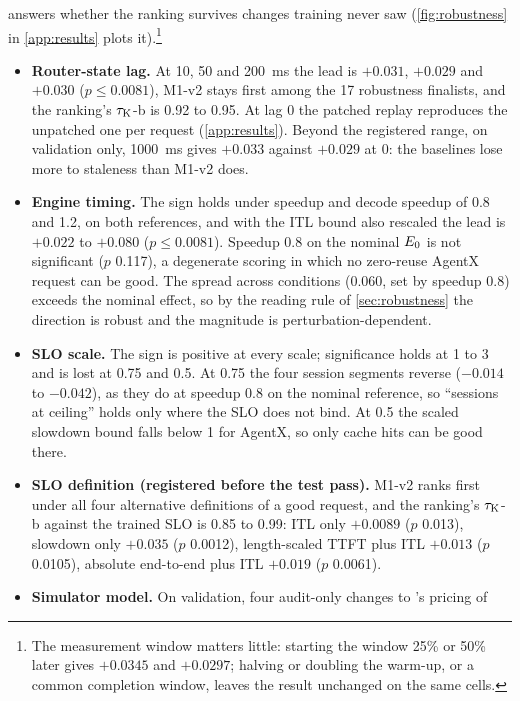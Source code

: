  answers whether the ranking survives changes training never saw
(\cref{fig:robustness} in \cref{app:results} plots it).\footnote{The measurement window matters
  little: starting the window 25\% or 50\% later gives $+0.0345$ and $+0.0297$; halving or doubling
  the warm-up, or a common completion window, leaves the result unchanged on the same cells.}
\begin{itemize}
  \item \textbf{Router-state lag.} At 10, 50 and \SI{200}{ms} the lead is $+0.031$, $+0.029$ and
    $+0.030$ ($p \le 0.0081$), M1-v2 stays first among the 17 robustness finalists, and the ranking's
    $\tau_{\mathrm{K}}$-b is 0.92 to 0.95. At lag 0 the patched replay reproduces the unpatched one per request
    (\cref{app:results}). Beyond the registered range, on validation only, \SI{1000}{ms} gives
    $+0.033$ against $+0.029$ at 0: the baselines lose more to staleness than M1-v2 does.
  \item \textbf{Engine timing.} The sign holds under speedup and decode speedup of 0.8 and 1.2, on
    both references, and with the ITL bound also rescaled the lead is $+0.022$ to $+0.080$
    ($p \le 0.0081$). Speedup 0.8 on the nominal $E_0$ is not significant ($p$ 0.117), a degenerate
    scoring in which no zero-reuse AgentX request can be good. The spread across conditions (0.060,
    set by speedup 0.8) exceeds the nominal effect, so by the reading rule of \cref{sec:robustness}
    the direction is robust and the magnitude is perturbation-dependent.
  \item \textbf{SLO scale.} The sign is positive at every scale; significance holds at 1 to 3 and is
    lost at 0.75 and 0.5. At 0.75 the four session segments reverse ($-0.014$ to $-0.042$), as they do
    at speedup 0.8 on the nominal reference, so ``sessions at ceiling'' holds only where the SLO does
    not bind. At 0.5 the scaled slowdown bound falls below 1 for AgentX, so only cache hits can be
    good there.
  \item \textbf{SLO definition (registered before the test pass).} M1-v2 ranks first under all
    four alternative definitions of a good request, and the ranking's $\tau_{\mathrm{K}}$-b against the
    trained SLO is 0.85 to 0.99: ITL only $+0.0089$ ($p$ 0.013), slowdown only $+0.035$ ($p$ 0.0012),
    length-scaled TTFT plus ITL $+0.013$ ($p$ 0.0105), absolute end-to-end plus ITL $+0.019$
    ($p$ 0.0061).
  \item \textbf{Simulator model.} On validation, four audit-only changes to \aisim{}'s pricing of

\end{itemize}
